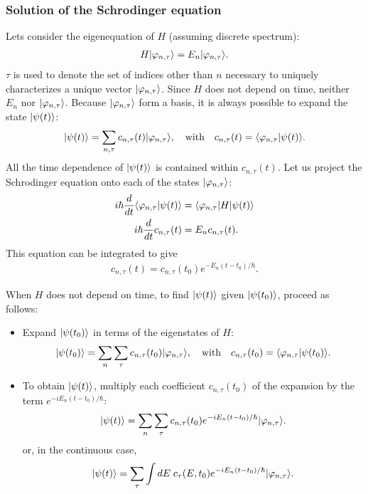 \subsubsection{Solution of the Schrodinger equation}
Lets consider the eigenequation of $H$ (assuming discrete spectrum):
\begin{align}
    H|\varphi_{n,\tau}\rangle=E_n|\varphi_{n,\tau}\rangle.
\end{align}
$\tau$ is used to denote the set of indices other than $n$ necessary to uniquely characterizes a unique vector $|\varphi_{n,\tau}\rangle$.
Since $H$ does not depend on time, neither $E_n$ nor $|\varphi_{n,\tau}\rangle$. Because $|\varphi_{n,\tau}\rangle$ form a basis,
it is always possible to expand the state $|\psi(t)\rangle$:
\begin{align*}
    |\psi(t)\rangle=\sum_{n,\tau}c_{n,\tau}(t)|\varphi_{n,\tau}\rangle,\quad\text{with}\quad c_{n,\tau}(t)=\langle\varphi_{n,\tau}|\psi(t)\rangle.
\end{align*}
All the time dependence of $|\psi(t)\rangle$ is contained within $c_{n,\tau}(t)$. Let us project the Schrodinger equation onto each 
of the states $|\varphi_{n,\tau}\rangle$:
\begin{align*}
    i\hbar\frac{d}{dt}\langle\varphi_{n,\tau}|\psi(t)\rangle&=\langle\varphi_{n,\tau}|H|\psi(t)\rangle\\
    i\hbar\frac{d}{dt}c_{n,\tau}(t)&=E_nc_{n,\tau}(t).
\end{align*}
This equation can be integrated to give
\begin{align}
    c_{n,\tau}(t)=c_{n,\tau}(t_0)e^{-E_n(t-t_0)/\hbar}.
\end{align}
\begin{emphasizer}[]
    When $H$ does not depend on time, to find $|\psi(t)\rangle$ given $|\psi(t_0)\rangle$, proceed as follows:
    \begin{itemize}[itemsep=0pt,topsep=0pt]
        \item Expand $|\psi(t_0)\rangle$ in terms of the eigenstates of $H$:
            \begin{align*}
                |\psi(t_0)\rangle=\sum_n\sum_\tau c_{n,\tau}(t_0)|\varphi_{n,\tau}\rangle,\quad\text{with}\quad c_{n,\tau}(t_0)=\langle\varphi_{n,\tau}|\psi(t_0)\rangle.
            \end{align*}
        \item To obtain $|\psi(t)\rangle$, multiply each coefficient $c_{n,\tau}(t_0)$ of the expansion by the term $e^{-iE_n(t-t_0)/\hbar}$:
        \begin{align}
            |\psi(t)\rangle=\sum_n\sum_\tau c_{n,\tau}(t_0)e^{-iE_n(t-t_0)/\hbar}|\varphi_{n,\tau}\rangle.
            \label{eq:discreteconservativesystem}
        \end{align}
        or, in the continuous case,
        \begin{align}
            |\psi(t)\rangle=\sum_\tau\int dE\;c_\tau(E,t_0)e^{-iE_n(t-t_0)/\hbar}|\varphi_{n,\tau}\rangle.
            \label{eq:continuousconservativesystem}
        \end{align}
    \end{itemize}
\end{emphasizer}
%
